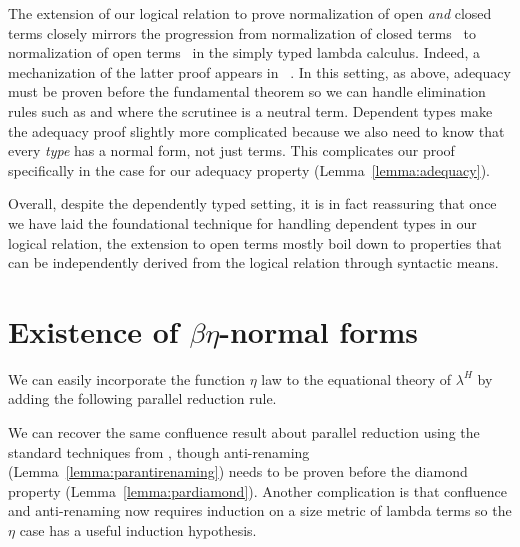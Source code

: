 \documentclass[acmsmall,screen=true,
\ifpublic review=false\else,review=true\fi
  ,anonymous=\ifanonymous true\else false\fi]{acmart}
\newcommand{\lang}{$\lambda^H$\xspace}
\begin{document}
The extension of our logical relation to prove normalization of open
\emph{and} closed terms closely mirrors the progression from
normalization of closed terms~\citep{harpertait} to normalization of
open terms~\citep{harperkripke} in the simply typed lambda calculus.
Indeed, a mechanization of the latter proof appears in ~\citet{abel2019poplmark}.
In this setting, as above, adequacy must be proven before the
fundamental theorem so we can handle elimination rules such as
 and  where the scrutinee is a neutral term. %
%
Dependent types make the adequacy proof slightly more complicated because we
also need to know that every \emph{type} has a normal form, not just
terms. This complicates our proof specifically in the  case for
our adequacy property (Lemma~\ref{lemma:adequacy}).

Overall, despite the dependently typed setting, it is in fact reassuring that
once we have laid the foundational technique for handling dependent types in
our logical relation, the extension to open terms mostly boil down to
properties that can be independently derived from the logical relation through
syntactic means.

\section{Existence of $\beta\eta$-normal forms}
\label{sec:betaeta}
We can easily incorporate the function $\eta$ law to the equational
theory of \lang{} by adding the following parallel reduction rule.
\begin{center}
\end{center}
We can recover the same confluence result about parallel reduction
using the standard techniques from
\citet{barendregt:lambda-calculi-with-types,
takahashi-parallel-reduction}, though anti-renaming
(Lemma~\ref{lemma:parantirenaming}) needs to be proven before the
diamond property (Lemma~\ref{lemma:pardiamond}). Another complication
is that confluence and anti-renaming now requires induction on a size
metric of lambda terms so the $\eta$ case has a useful induction hypothesis.
\end{document}
